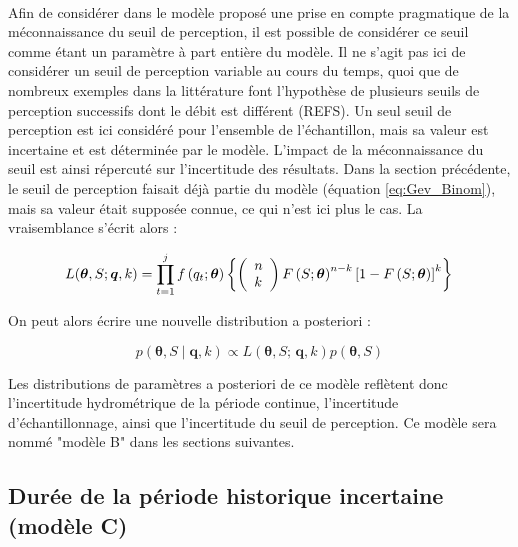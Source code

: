 \documentclass[11pt]{article}
\begin{document}
		\paragraph{}
		Afin de considérer dans le modèle proposé une prise en compte pragmatique de la méconnaissance du seuil de perception, il est possible de considérer ce seuil comme étant un paramètre à part entière du modèle. Il ne s'agit pas ici de considérer un seuil de perception variable au cours du temps, quoi que de nombreux exemples dans la littérature font l'hypothèse de plusieurs seuils de perception successifs dont le débit est différent (REFS). Un seul seuil de perception est ici considéré pour l'ensemble de l'échantillon, mais sa valeur est incertaine et est déterminée par le modèle. L'impact de la méconnaissance du seuil est ainsi répercuté sur l'incertitude des résultats. Dans la section précédente, le seuil de perception faisait déjà partie du modèle (équation \ref{eq:Gev_Binom}), mais sa valeur était supposée connue, ce qui n'est ici plus le cas. La vraisemblance s'écrit alors : 
		
				\begin{equation}
				L(\boldsymbol{\theta}, S ; \boldsymbol{q}, k) =\prod_{t=1}^j f\left(q_t;\boldsymbol{\theta}\right) \left\{\left(\begin{array}{l}
				n \\
				k
				\end{array}\right) F\left(S;\boldsymbol{\theta}\right)^{n-k}\left[1-F\left(S;\boldsymbol{\theta}\right)\right]^k\right\} \\
				\label{eq:Gev_Binom_uS}
				\end{equation}
				
		On peut alors écrire une nouvelle distribution a posteriori : 			
				
				\begin{equation}
					p(\boldsymbol{\theta}, S \mid \boldsymbol{q},k) \propto L(\boldsymbol{\theta},S;\,\boldsymbol{q},k) p(\boldsymbol{\theta},S)
					\label{eq:Bayes_uS}
				\end{equation}
			
		Les distributions de paramètres a posteriori de ce modèle reflètent donc l'incertitude hydrométrique de la période continue, l'incertitude d'échantillonnage, ainsi que l'incertitude du seuil de perception. Ce modèle sera nommé "modèle B" dans les sections suivantes.
		

	\subsection{Durée de la période historique incertaine (modèle C)}
	
\end{document}
